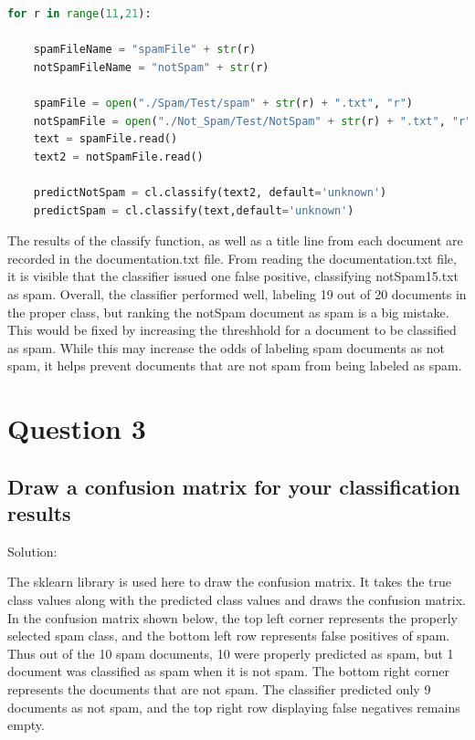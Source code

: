 \documentclass[11pt]{scrartcl} %
\begin{document}
\begin{lstlisting}[language = Python, caption= Clustering into 5 groups]
for r in range(11,21):

    spamFileName = "spamFile" + str(r)
    notSpamFileName = "notSpam" + str(r)
  
    spamFile = open("./Spam/Test/spam" + str(r) + ".txt", "r")
    notSpamFile = open("./Not_Spam/Test/NotSpam" + str(r) + ".txt", "r")
    text = spamFile.read()
    text2 = notSpamFile.read()

    predictNotSpam = cl.classify(text2, default='unknown')
    predictSpam = cl.classify(text,default='unknown')
\end{lstlisting}

\tabto{2.0cm} The results of the classify function, as well as a title line from each document are recorded in the documentation.txt file. From reading the documentation.txt file, it is visible that the classifier issued one false positive, classifying notSpam15.txt as spam. \newline \newline Overall, the classifier performed well, labeling 19 out of 20 documents in the proper class, but ranking the notSpam document as spam is a big mistake. This would be fixed by increasing the threshhold for a document to be classified as spam. While this may increase the odds of labeling spam documents as not spam, it helps prevent documents that are not spam from being labeled as spam.

\pagebreak


\section*{Question 3}

\subsection*{Draw a confusion matrix for your classification results}

\bigskip\bigskip
\LARGE Solution: \newline\newline\small


\tabto{2.0cm} The sklearn library is used here to draw the confusion matrix. It takes the true class values along with the predicted class values and draws the confusion matrix. \newline \newline In the confusion matrix shown below, the top left corner represents the properly selected spam class, and the bottom left row represents false positives of spam. Thus out of the 10 spam documents, 10 were properly predicted as spam, but 1 document was classified as spam when it is not spam.  \newline \newline The bottom right corner represents the documents that are not spam. The classifier predicted only 9 documents as not spam, and the top right row displaying false negatives remains empty.
\end{document}
